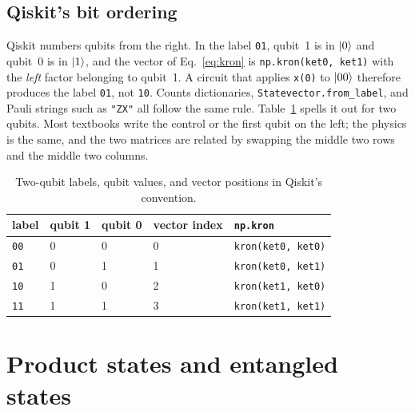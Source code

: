 \documentclass[11pt]{article}
\newcommand{\code}[1]{\texttt{#1}}
\begin{document}
\subsection{Qiskit's bit ordering}

Qiskit numbers qubits from the right. In the label \code{01}, qubit~1 is in $\ket{0}$ and qubit~0 is in $\ket{1}$, and the vector of Eq.~\eqref{eq:kron} is \code{np.kron(ket0, ket1)} with the \emph{left} factor belonging to qubit~1. A circuit that applies \code{x(0)} to $\ket{00}$ therefore produces the label \code{01}, not \code{10}. Counts dictionaries, \code{Statevector.from\_label}, and Pauli strings such as \code{"ZX"} all follow the same rule. Table~\ref{tab:order} spells it out for two qubits. Most textbooks write the control or the first qubit on the left; the physics is the same, and the two matrices are related by swapping the middle two rows and the middle two columns.

\begin{table}[h]
\centering
\small
\begin{tabular}{@{}lllll@{}}
\toprule
label & qubit 1 & qubit 0 & vector index & \code{np.kron} \\
\midrule
\code{00} & 0 & 0 & 0 & \code{kron(ket0, ket0)} \\
\code{01} & 0 & 1 & 1 & \code{kron(ket0, ket1)} \\
\code{10} & 1 & 0 & 2 & \code{kron(ket1, ket0)} \\
\code{11} & 1 & 1 & 3 & \code{kron(ket1, ket1)} \\
\bottomrule
\end{tabular}
\caption{Two-qubit labels, qubit values, and vector positions in Qiskit's convention.}
\label{tab:order}
\end{table}

\section{Product states and entangled states}
\end{document}
